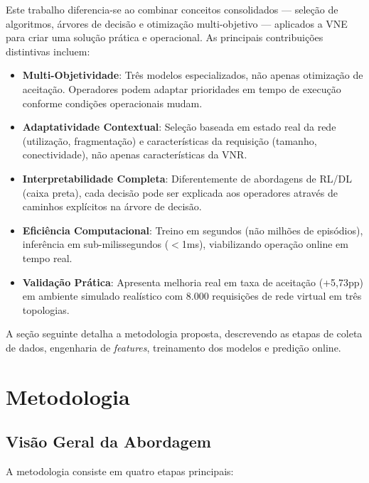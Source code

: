\documentclass[conference]{IEEEtran}
\begin{document}
Este trabalho diferencia-se ao combinar conceitos consolidados — seleção de algoritmos, árvores de decisão e otimização multi-objetivo — aplicados a VNE para criar uma solução prática e operacional. As principais contribuições distintivas incluem:
\begin{itemize}
    \item \textbf{Multi-Objetividade}: Três modelos especializados, não apenas otimização de aceitação. Operadores podem adaptar prioridades em tempo de execução conforme condições operacionais mudam.

    \item \textbf{Adaptatividade Contextual}: Seleção baseada em estado real da rede (utilização, fragmentação) e características da requisição (tamanho, conectividade), não apenas características da VNR.

    \item \textbf{Interpretabilidade Completa}: Diferentemente de abordagens de RL/DL (caixa preta), cada decisão pode ser explicada aos operadores através de caminhos explícitos na árvore de decisão.

    \item \textbf{Eficiência Computacional}: Treino em segundos (não milhões de episódios), inferência em sub-milissegundos ($<$1ms), viabilizando operação online em tempo real.

    \item \textbf{Validação Prática}: Apresenta melhoria real em taxa de aceitação (+5,73pp) em ambiente simulado realístico com 8.000 requisições de rede virtual em três topologias.
\end{itemize}

A seção seguinte detalha a metodologia proposta, descrevendo as etapas de coleta de dados, engenharia de \textit{features}, treinamento dos modelos e predição online.

\section{Metodologia}
\label{sec:Proposal}

\subsection{Visão Geral da Abordagem}

A metodologia consiste em quatro etapas principais:
\end{document}
